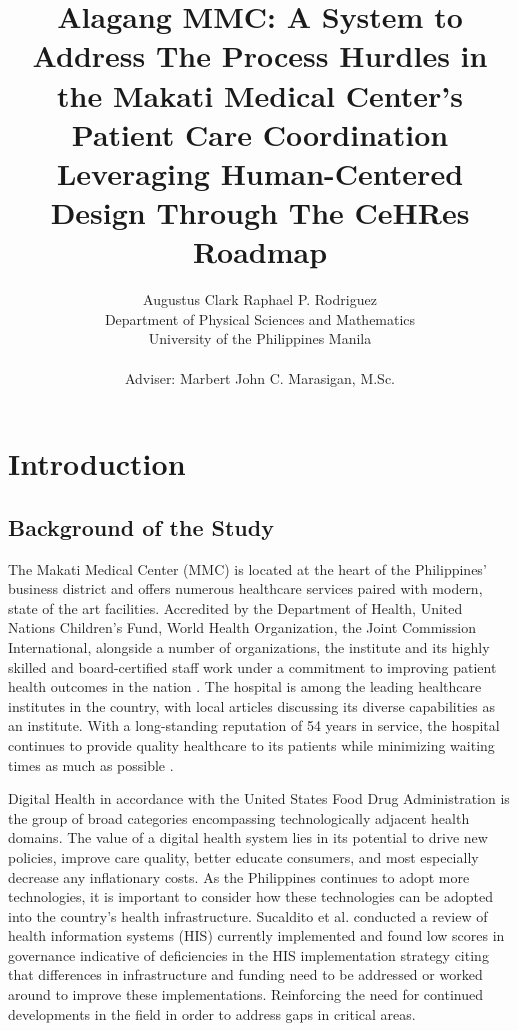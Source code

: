 \documentclass[11pt,a4paper,titlepage]{article}
\title {Alagang MMC: A System to Address The Process Hurdles in the Makati Medical Center's Patient Care Coordination Leveraging Human-Centered Design Through The CeHRes Roadmap}
\author {Augustus Clark Raphael P. Rodriguez \\ Department of Physical Sciences and Mathematics \\ University of the Philippines Manila \\ \\
	Adviser: Marbert John C. Marasigan, M.Sc.}
\date{}
\let\stdsection\section
\renewcommand\section{\newpage\stdsection}
\begin{document}
	\maketitle
	\tableofcontents
	\section{Introduction}
	\subsection{Background of the Study}
	The Makati Medical Center (MMC) is located at the heart of the Philippines' business district and offers numerous healthcare services paired with modern, state of the art facilities. Accredited by the Department of Health, United Nations Children's Fund, World Health Organization, the Joint Commission International, alongside a number of organizations, the institute and its highly skilled and board-certified staff work under a commitment to improving patient health outcomes in the nation \cite{makatimedicalcenter_about, makatimedicalcenter_2025_makatimed}. The hospital is among the leading healthcare institutes in the country, with local articles discussing its diverse capabilities as an institute. With a long-standing reputation of 54 years in service, the hospital continues to provide quality healthcare to its patients while minimizing waiting times as much as possible \cite{kritikakritika_2025_top, metroguide_2021_the, flor_2023_top, makatimedicalcenter_history}. 
	
	Digital Health in accordance with the United States Food Drug Administration \cite{foodanddrugadministration_2020_what} is the group of broad categories encompassing technologically adjacent health domains. The value of a digital health system lies in its potential to drive new policies, improve care quality, better educate consumers, and most especially decrease any inflationary costs. As the Philippines continues to adopt more technologies, it is important to consider how these technologies can be adopted into the country's health infrastructure. Sucaldito et al. \cite{sucaldito_2025_challenges} conducted a review of health information systems (HIS) currently implemented and found low scores in governance indicative of deficiencies in the HIS implementation strategy citing that differences in infrastructure and funding need to be addressed or worked around to improve these implementations. Reinforcing the need for continued developments in the field in order to address gaps in critical areas. 
	
\end{document}
